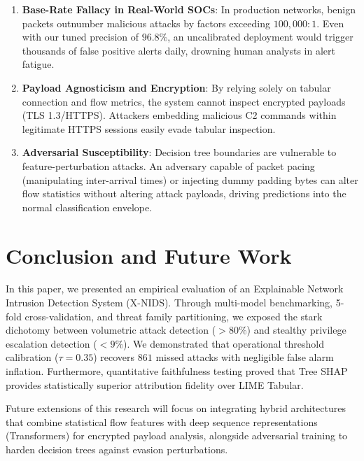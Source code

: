 \documentclass[conference]{IEEEtran}
\begin{document}
\begin{enumerate}
    \item \textbf{Base-Rate Fallacy in Real-World SOCs}: In production networks, benign packets outnumber malicious attacks by factors exceeding $100{,}000{:}1$. Even with our tuned precision of $96.8\%$, an uncalibrated deployment would trigger thousands of false positive alerts daily, drowning human analysts in alert fatigue.
    \item \textbf{Payload Agnosticism and Encryption}: By relying solely on tabular connection and flow metrics, the system cannot inspect encrypted payloads (TLS 1.3/HTTPS). Attackers embedding malicious C2 commands within legitimate HTTPS sessions easily evade tabular inspection.
    \item \textbf{Adversarial Susceptibility}: Decision tree boundaries are vulnerable to feature-perturbation attacks. An adversary capable of packet pacing (manipulating inter-arrival times) or injecting dummy padding bytes can alter flow statistics without altering attack payloads, driving predictions into the normal classification envelope.
\end{enumerate}

\section{Conclusion and Future Work}

In this paper, we presented an empirical evaluation of an Explainable Network Intrusion Detection System (X-NIDS). Through multi-model benchmarking, 5-fold cross-validation, and threat family partitioning, we exposed the stark dichotomy between volumetric attack detection ($>80\%$) and stealthy privilege escalation detection ($<9\%$). We demonstrated that operational threshold calibration ($\tau = 0.35$) recovers $861$ missed attacks with negligible false alarm inflation. Furthermore, quantitative faithfulness testing proved that Tree SHAP provides statistically superior attribution fidelity over LIME Tabular.

Future extensions of this research will focus on integrating hybrid architectures that combine statistical flow features with deep sequence representations (Transformers) for encrypted payload analysis, alongside adversarial training to harden decision trees against evasion perturbations.
\end{document}
